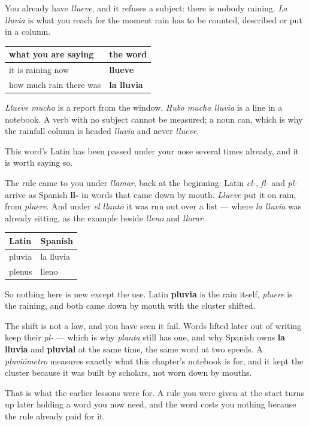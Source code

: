 \begin{grammarlens}[title={Grammar Lens: the verb and the noun do different work}]
You already have \emph{llueve}, and it refuses a subject: there is nobody raining. \emph{La lluvia} is what you reach for the moment rain has to be counted, described or put in a column.

\noindent
\begin{tabularx}{\linewidth}{@{}>{\raggedright\arraybackslash}X>{\raggedright\arraybackslash}X@{}}
\toprule
\textbf{what you are saying} & \textbf{the word} \\
\midrule
it is raining now & \textbf{llueve} \\
how much rain there was & \textbf{la lluvia} \\
\bottomrule
\end{tabularx}

\emph{Llueve mucho} is a report from the window. \emph{Hubo mucha lluvia} is a line in a notebook. A verb with no subject cannot be measured; a noun can, which is why the rainfall column is headed \emph{lluvia} and never \emph{llueve}.
\end{grammarlens}

\begin{cousinweb}
This word's Latin has been passed under your nose several times already, and it is worth saying so.

The rule came to you under \emph{llamar}, back at the beginning: Latin \emph{cl-}, \emph{fl-} and \emph{pl-} arrive as Spanish \textbf{ll-} in words that came down by mouth. \emph{Llueve} put it on rain, from \emph{pluere}. And under \emph{el llanto} it was run out over a list — where \emph{la lluvia} was already sitting, as the example beside \emph{lleno} and \emph{llorar}.

\noindent
\begin{tabularx}{\linewidth}{@{}>{\raggedright\arraybackslash}X>{\raggedright\arraybackslash}X@{}}
\toprule
\textbf{Latin} & \textbf{Spanish} \\
\midrule
pluvia & la lluvia \\
plenus & lleno \\
\bottomrule
\end{tabularx}

So nothing here is new except the use. Latin \textbf{pluvia} is the rain itself, \emph{pluere} is the raining, and both came down by mouth with the cluster shifted.

The shift is not a law, and you have seen it fail. Words lifted later out of writing keep their \emph{pl-} — which is why \emph{planta} still has one, and why Spanish owns \textbf{la lluvia} and \textbf{pluvial} at the same time, the same word at two speeds. A \emph{pluviómetro} measures exactly what this chapter's notebook is for, and it kept the cluster because it was built by scholars, not worn down by mouths.

That is what the earlier lessons were for. A rule you were given at the start turns up later holding a word you now need, and the word costs you nothing because the rule already paid for it.
\end{cousinweb}

